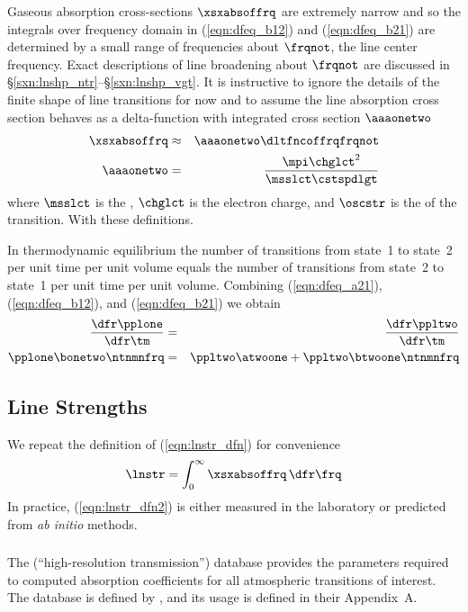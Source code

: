 \documentclass[12pt]{article}
\begin{document}
Gaseous absorption cross-sections $\xsxabsoffrq$ are extremely narrow
and so the integrals over frequency domain in (\ref{eqn:dfeq_b12}) and
(\ref{eqn:dfeq_b21}) are determined by a small range of frequencies
about $\frqnot$, the line center frequency.
Exact descriptions of line broadening about $\frqnot$ are discussed in
\S\ref{sxn:lnshp_ntr}--\S\ref{sxn:lnshp_vgt}.
It is instructive to ignore the details of the finite shape of line
transitions for now and to assume the line absorption cross
section behaves as a delta-function with integrated cross section
$\aaaonetwo$ 
\begin{eqnarray}
\xsxabsoffrq & \approx & \aaaonetwo \dltfncoffrqfrqnot \\
\aaaonetwo & = & \frac{\mpi \chglct^{2}}{\msslct \cstspdlgt}
\label{eqn:xsx_abs_dlt_dfn}
\end{eqnarray}
where $\msslct$ is the ,
$\chglct$ is the electron charge, and
$\oscstr$ is the  of the transition.
With these definitions.

In thermodynamic equilibrium 
the number of transitions from state~1 to state~2 per unit time per unit volume 
equals 
the number of transitions from state~2 to state~1 per unit time per unit volume.
Combining (\ref{eqn:dfeq_a21}), (\ref{eqn:dfeq_b12}), and
(\ref{eqn:dfeq_b21}) we obtain 
\begin{eqnarray}
\frac{\dfr \pplone}{\dfr\tm} & = & \frac{\dfr \ppltwo}{\dfr\tm}
\nonumber \\
\pplone \bonetwo \ntnmnfrq & = & \ppltwo \atwoone + \ppltwo \btwoone \ntnmnfrq
\label{eqn:_dfn}
\end{eqnarray}

\subsection[Line Strengths]{Line Strengths}\label{sxn:lnstr}
We repeat the definition of 
(\ref{eqn:lnstr_dfn}) for convenience
\begin{equation}
\lnstr = \int_{0}^{\infty} \xsxabsoffrq \,\dfr\frq
\label{eqn:lnstr_dfn2}
\end{equation}
In practice, (\ref{eqn:lnstr_dfn2}) is either measured in the
laboratory or predicted from \textit{ab initio} methods.

\subsubsection[\acr{HITRAN}]{}\label{sxn:htrn}
The  (``high-resolution transmission'') database provides the
parameters required to computed absorption coefficients for all
atmospheric transitions of interest. 
The  database is defined by \cite{RRG98}, and its usage is
defined in their Appendix~A.
\end{document}
